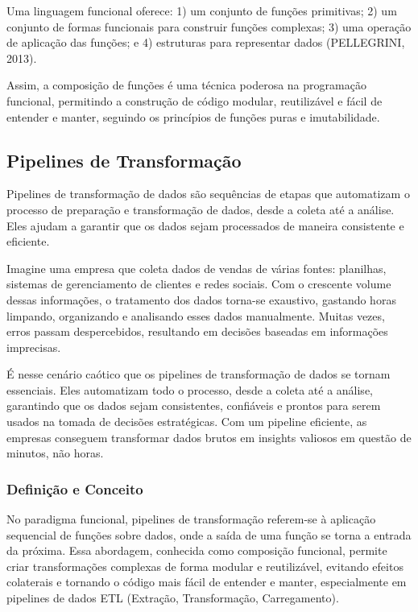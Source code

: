 Uma linguagem funcional oferece: 1) um conjunto de funções primitivas; 2) um conjunto de formas funcionais para construir funções complexas; 3) uma operação de aplicação das funções; e 4) estruturas para representar dados (PELLEGRINI, 2013).

Assim, a composição de funções é uma técnica poderosa na programação funcional, permitindo a construção de código modular, reutilizável e fácil de entender e manter, seguindo os princípios de funções puras e imutabilidade.




\subsection{Pipelines de Transformação}
Pipelines de transformação de dados são sequências de etapas que automatizam o processo de preparação e transformação de dados, desde a coleta até a análise. Eles ajudam a garantir que os dados sejam processados de maneira consistente e eficiente.

Imagine uma empresa que coleta dados de vendas de várias fontes: planilhas, sistemas de gerenciamento de clientes e redes sociais. Com o crescente volume dessas informações, o tratamento dos dados torna-se exaustivo, gastando horas limpando, organizando e analisando esses dados manualmente. Muitas vezes, erros passam despercebidos, resultando em decisões baseadas em informações imprecisas.

É nesse cenário caótico que os pipelines de transformação de dados se tornam essenciais. Eles automatizam todo o processo, desde a coleta até a análise, garantindo que os dados sejam consistentes, confiáveis e prontos para serem usados na tomada de decisões estratégicas. Com um pipeline eficiente, as empresas conseguem transformar dados brutos em insights valiosos em questão de minutos, não horas.

\subsubsection{Definição e Conceito}
No paradigma funcional, pipelines de transformação referem-se à aplicação sequencial de funções sobre dados, onde a saída de uma função se torna a entrada da próxima. Essa abordagem, conhecida como composição funcional, permite criar transformações complexas de forma modular e reutilizável, evitando efeitos colaterais e tornando o código mais fácil de entender e manter, especialmente em pipelines de dados ETL (Extração, Transformação, Carregamento).


